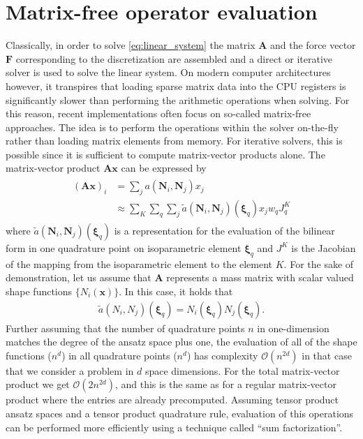 \documentclass[preprint,12pt,times]{elsarticle}
\def\gz  #1{           \mbox{$\boldsymbol{#1}$}}
\begin{document}
\section{Matrix-free operator evaluation}
\label{sec:mf}
Classically, in order to solve \eqref{eq:linear_system} the matrix $\gz A$ and the force vector $\gz F$ corresponding to the discretization are assembled and
a direct or iterative solver is used to solve the linear system.
On modern computer architectures however, it transpires that loading sparse matrix data into the CPU registers is significantly slower than performing the arithmetic operations when solving.
For this reason, recent implementations often focus on so-called matrix-free approaches. The idea is to perform the operations within the solver on-the-fly
rather than loading matrix elements from memory.
For iterative solvers, this is possible since it is sufficient to compute matrix-vector products alone.
%
The matrix-vector product $\gz A \gz x$ can be expressed by
\begin{align}
  \begin{split}
 (\gz A \gz x)_i &= \sum_j a(\gz N_i,\gz N_j) x_j \\
        &\approx \sum_K \sum_q \sum_j \tilde{a}(\gz N_i,\gz N_j)(\gz \xi_q) x_j w_q J^K_q
  \end{split}
  \label{eq:mf_vmult}
\end{align}
where $\tilde{a}(\gz N_i,\gz N_j)(\gz \xi_q)$ is a representation for the evaluation of the bilinear form in one quadrature point on isoparametric element $\gz \xi_q$ and $J^K$ is the Jacobian of the mapping from the isoparametric element to the element $K$.
For the sake of demonstration, let us assume that $\gz A$ represents a mass matrix with scalar valued shape functions $\{ N_i(\gz x) \}$. In this case, it holds that
\begin{align*}
 \tilde{a}(N_i,N_j)(\gz \xi_q) = N_i(\gz \xi_q)N_j(\gz \xi_q).
\end{align*}
Further assuming that the number of quadrature points $n$ in one-dimension matches the degree of the ansatz space plus one, the evaluation of all of the shape functions ($n^d$)
in all quadrature points ($n^d$) has complexity $\mathcal{O}(n^{2d})$ in that case that we consider a problem in $d$ space dimensions. For the total matrix-vector product we get $\mathcal{O}(2n^{2d})$,
and this is the same as for a regular matrix-vector product where the entries are already precomputed. Assuming tensor product ansatz spaces and a tensor product quadrature rule, evaluation of this operations can be performed more efficiently using a technique called ``sum factorization''.
\end{document}

